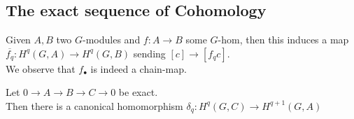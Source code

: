 \documentclass[../main.tex]{subfiles}
\begin{document}
\subsection{The exact sequence of Cohomology}
Given $A,B$ two $G$-modules and $f:A\to B$ some $G$-hom, then this induces a map $ \overline{f_q}: H^{q}( G,A) \to H^{q}( G,B) $ sending $[c] \to [ f_q c] $.\\
We observe that $f_\bullet$ is indeed a chain-map.
\begin{thm}
	Let $0 \to A \to B \to C \to 0$ be exact.\\
	Then there is a canonical homomorphism $\delta_q: H^{q}( G,C) \to H^{q+1}( G,A) $ 
\end{thm}
\end{document}
